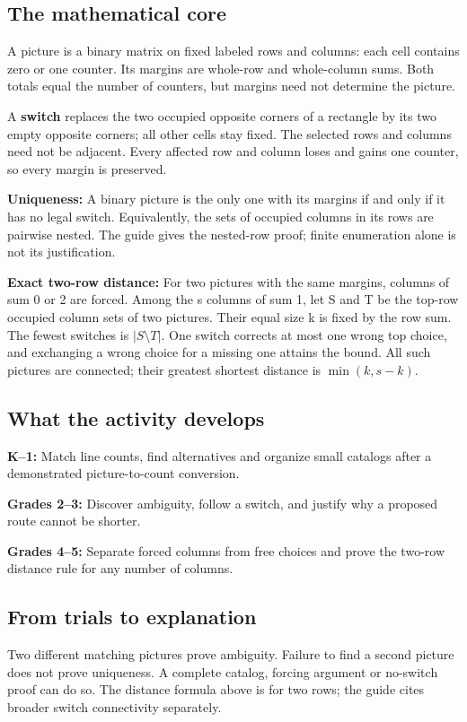 \subsection*{The mathematical core}
A picture is a binary matrix on fixed labeled rows and columns: each cell contains zero or one counter. Its margins are whole-row and whole-column sums. Both totals equal the number of counters, but margins need not determine the picture.

A \textbf{switch} replaces the two occupied opposite corners of a rectangle by its two empty opposite corners; all other cells stay fixed. The selected rows and columns need not be adjacent. Every affected row and column loses and gains one counter, so every margin is preserved.

\textbf{Uniqueness:} A binary picture is the only one with its margins if and only if it has no legal switch. Equivalently, the sets of occupied columns in its rows are pairwise nested. The guide gives the nested-row proof; finite enumeration alone is not its justification.

\textbf{Exact two-row distance:} For two pictures with the same margins, columns of sum 0 or 2 are forced. Among the s columns of sum 1, let S and T be the top-row occupied column sets of two pictures. Their equal size k is fixed by the row sum. The fewest switches is $|S\setminus T|$. One switch corrects at most one wrong top choice, and exchanging a wrong choice for a missing one attains the bound. All such pictures are connected; their greatest shortest distance is $\min(k,s-k)$.

\subsection*{What the activity develops}
\textbf{K--1:} Match line counts, find alternatives and organize small catalogs after a demonstrated picture-to-count conversion.

\textbf{Grades 2--3:} Discover ambiguity, follow a switch, and justify why a proposed route cannot be shorter.

\textbf{Grades 4--5:} Separate forced columns from free choices and prove the two-row distance rule for any number of columns.

\subsection*{From trials to explanation}
Two different matching pictures prove ambiguity. Failure to find a second picture does not prove uniqueness. A complete catalog, forcing argument or no-switch proof can do so. The distance formula above is for two rows; the guide cites broader switch connectivity separately.

